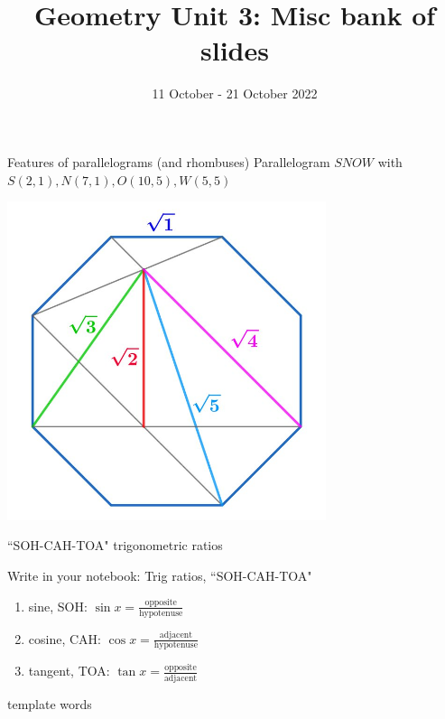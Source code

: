 

\title{Geometry Unit 3: Misc bank of slides}
\date{11 October - 21 October 2022}


\frame{\titlepage}
\section[Outline]{}
\frame{\tableofcontents}

\begin{frame}{Features of parallelograms (and rhombuses)}
  Parallelogram $SNOW$ with $S(2,1),N(7,1),O(10,5),W(5,5)$\\[0.5cm]
\end{frame}

\begin{frame}
  \includegraphics[width=0.7\textwidth]{../graphics/octagon-radicals.jpg}
\end{frame}

\begin{frame}{``SOH-CAH-TOA" trigonometric ratios}
  \begin{block}{Write in your notebook: Trig ratios, ``SOH-CAH-TOA"}
    \begin{enumerate}
        \item sine, SOH: $\displaystyle \sin x = \frac{\text{opposite}} {\text{hypotenuse}}$
        \item cosine, CAH: $\displaystyle \cos x = \frac{\text{adjacent}} {\text{hypotenuse}}$
        \item tangent, TOA: $\displaystyle \tan x = \frac{\text{opposite}} {\text{adjacent}}$
    \end{enumerate}
    \end{block}
\end{frame}


\begin{frame}{template}
  words
\end{frame}


